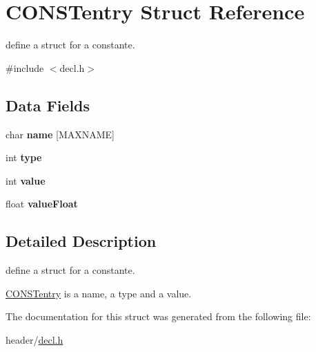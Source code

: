 \hypertarget{struct_c_o_n_s_tentry}{}\section{C\+O\+N\+S\+Tentry Struct Reference}
\label{struct_c_o_n_s_tentry}


define a struct for a constante.  




{\ttfamily \#include $<$decl.\+h$>$}

\subsection*{Data Fields}
\begin{DoxyCompactItemize}
\item 
\mbox{\label{struct_c_o_n_s_tentry_afdd40a771835cf5f3511c7ac6fb6e664}} 
char {\bfseries name} \mbox{[}M\+A\+X\+N\+A\+ME\mbox{]}
\item 
\mbox{\label{struct_c_o_n_s_tentry_ac765329451135abec74c45e1897abf26}} 
int {\bfseries type}
\item 
\mbox{\label{struct_c_o_n_s_tentry_ac4f474c82e82cbb89ca7c36dd52be0ed}} 
int {\bfseries value}
\item 
\mbox{\label{struct_c_o_n_s_tentry_ab271bf689e787edf8ddff375682937d2}} 
float {\bfseries value\+Float}
\end{DoxyCompactItemize}


\subsection{Detailed Description}
define a struct for a constante. 

\hyperlink{struct_c_o_n_s_tentry}{C\+O\+N\+S\+Tentry} is a name, a type and a value. 

The documentation for this struct was generated from the following file\+:\begin{DoxyCompactItemize}
\item 
header/\hyperlink{decl_8h}{decl.\+h}\end{DoxyCompactItemize}

